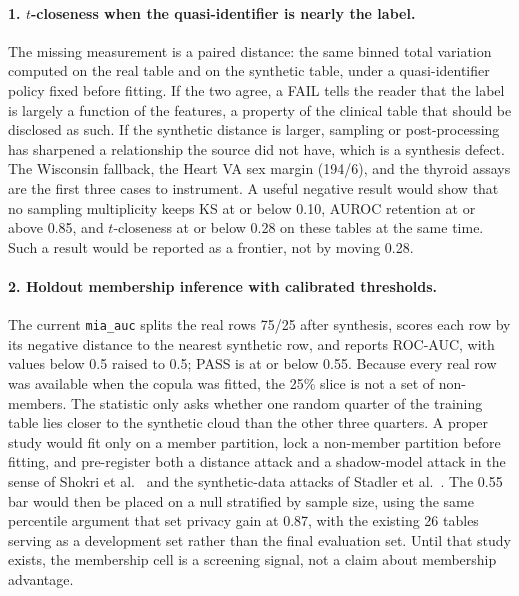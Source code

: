 \documentclass[11pt,a4paper]{article}
\begin{document}
\paragraph{1. $t$-closeness when the quasi-identifier is nearly the label.}
The missing measurement is a paired distance: the same binned total variation computed on the real table and on the synthetic table, under a quasi-identifier policy fixed before fitting. If the two agree, a FAIL tells the reader that the label is largely a function of the features, a property of the clinical table that should be disclosed as such. If the synthetic distance is larger, sampling or post-processing has sharpened a relationship the source did not have, which is a synthesis defect. The Wisconsin fallback, the Heart VA sex margin (194/6), and the thyroid assays are the first three cases to instrument. A useful negative result would show that no sampling multiplicity keeps KS at or below 0.10, AUROC retention at or above 0.85, and $t$-closeness at or below 0.28 on these tables at the same time. Such a result would be reported as a frontier, not by moving 0.28.

\paragraph{2. Holdout membership inference with calibrated thresholds.}
The current \texttt{mia\_auc} splits the real rows 75/25 after synthesis, scores each row by its negative distance to the nearest synthetic row, and reports ROC-AUC, with values below 0.5 raised to 0.5; PASS is at or below 0.55. Because every real row was available when the copula was fitted, the 25\% slice is not a set of non-members. The statistic only asks whether one random quarter of the training table lies closer to the synthetic cloud than the other three quarters. A proper study would fit only on a member partition, lock a non-member partition before fitting, and pre-register both a distance attack and a shadow-model attack in the sense of Shokri et al.~\cite{shokri2017} and the synthetic-data attacks of Stadler et al.~\cite{stadler2022}. The 0.55 bar would then be placed on a null stratified by sample size, using the same percentile argument that set privacy gain at 0.87, with the existing 26 tables serving as a development set rather than the final evaluation set. Until that study exists, the membership cell is a screening signal, not a claim about membership advantage.
\end{document}
